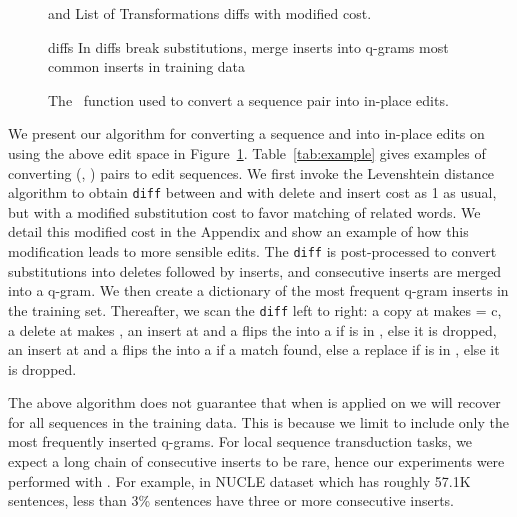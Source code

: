 \documentclass[11pt,a4paper]{article}
\newcommand{\cpy}{\mbox{\sc c}}
\newcommand{\editF}{{\text{Seq2Edits}}}
\begin{document}
\begin{figure}
\begin{small}
\begin{algorithmic}
\Require{, } and   List of Transformations
\State diffs  with modified cost.

\State diffs  In diffs break substitutions, merge inserts into q-grams
\State   most common inserts in training data
\State 
{}
        \State 
    \ElsIf{}
       \If{} 
                \State 
            \Else
                \State   
            \EndIf
       \ElsIf{}
            \State 
        \EndIf
    \EndIf
\EndFor
\Return{}
\end{algorithmic}
\caption{The \editF\ function used to convert a sequence pair  into in-place edits.}
\label{algo2:generate_edits}
\end{small}
\end{figure}

We present our algorithm for converting a sequence  and  into in-place
edits on  using the above edit space in 
Figure~\ref{algo2:generate_edits}. Table~\ref{tab:example} gives
examples of converting (, ) pairs to edit sequences.
We first invoke the Levenshtein distance algorithm
\citep{levenshtein1966binary} to obtain {\tt diff} between  and
 with delete and insert cost as 1 as usual, but with a modified
substitution cost to favor matching of related words. 
We detail this modified cost in the Appendix and show
an example of how this modification leads to more sensible
edits.  The {\tt diff} is post-processed to convert substitutions
into deletes followed by inserts, and consecutive inserts are merged
into a q-gram. We then create a dictionary  of the  most frequent
q-gram inserts in the training set.
Thereafter, we scan the {\tt diff} left to right: a copy at  makes  = \cpy, a delete at  makes , an insert  at  and a  flips the  into a  if  is in , else it is dropped, an insert  at  and a  flips the  
into a  if a match found, else a replace  if  is in , else it is dropped.

The above algorithm does not guarantee that when  is applied on
 we will recover  for all sequences in the training
data.  This is because we limit   to include only
the  most frequently inserted q-grams.  For local sequence transduction tasks,
we expect a long chain of consecutive inserts to be rare, hence our
experiments were performed with .
For example, in NUCLE dataset \cite{ng2014conll} which has roughly 57.1K sentences, less than 3\%  sentences have three or more consecutive inserts.
 
\end{document}
